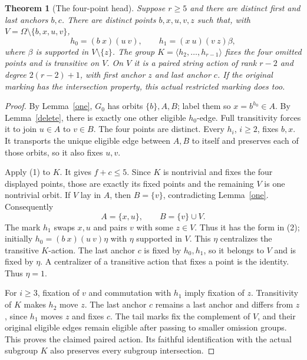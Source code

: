 \documentclass[11pt,a4paper]{article}
\newtheorem{theorem}[lemma]{Theorem}
\newcommand{\gen}[1]{\langle#1\rangle}
\begin{document}
\begin{theorem}[The four-point head]\label{head}
Suppose $r\ge5$ and there are distinct first and last anchors $b,c$.
There are distinct points $b,x,u,v,z$ such that, with
$V=\Omega\setminus\{b,x,u,v\}$,
\[
 h_0=(b\ x)(u\ v),\qquad h_1=(x\ u)(v\ z)\beta,       \tag{2}
\]
where $\beta$ is supported in $V\setminus\{z\}$.
The group $K=\gen{h_2,\ldots,h_{r-1}}$ fixes the four omitted
points and is transitive on $V$. On $V$ it is a paired string
action of rank $r-2$ and degree $2(r-2)+1$, with first anchor
$z$ and last anchor $c$. If the original marking has the
intersection property, this actual restricted marking does too.
\end{theorem}
\begin{proof}
By Lemma~\ref{one}, $G_0$ has orbits $\{b\},A,B$; label them so
$x=b^{h_0}\in A$. By Lemma~\ref{delete}, there is exactly one
other eligible $h_0$-edge. Full transitivity forces it to join
$u\in A$ to $v\in B$. The four points are distinct. Every
$h_i$, $i\ge2$, fixes $b,x$. It transports the unique eligible
edge between $A,B$ to itself and preserves each of those orbits,
so it also fixes $u,v$.

Apply (1) to $K$. It gives $f+c\le5$. Since $K$ is nontrivial
and fixes the four displayed points, those are exactly its fixed
points and the remaining $V$ is one nontrivial orbit. If $V$
lay in $A$, then $B=\{v\}$, contradicting Lemma~\ref{one}.
Consequently
\[
                        A=\{x,u\},\qquad B=\{v\}\cup V.
\]
The mark $h_1$ swaps $x,u$ and pairs $v$ with some $z\in V$.
Thus it has the form in (2); initially $h_0=(b\ x)(u\ v)\eta$
with $\eta$ supported in $V$. This $\eta$ centralizes the
transitive $K$-action. The last anchor $c$ is fixed by $h_0,h_1$,
so it belongs to $V$ and is fixed by $\eta$. A centralizer of a
transitive action that fixes a point is the identity. Thus $\eta=1$.

For $i\ge3$, fixation of $v$ and commutation with $h_1$ imply
fixation of $z$. Transitivity of $K$ makes $h_2$ move $z$.
The last anchor $c$ remains a last anchor and differs from $z$,
since $h_1$ moves $z$ and fixes $c$. The tail marks fix the
complement of $V$, and their original eligible edges remain
eligible after passing to smaller omission groups. This proves
the claimed paired action. Its faithful identification with the
actual subgroup $K$ also preserves every subgroup intersection.
\end{proof}
\end{document}
